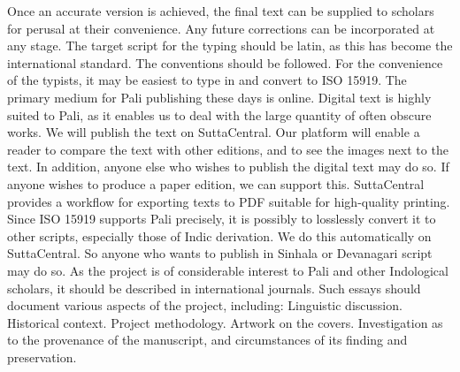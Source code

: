 {}Once an accurate version is achieved, the final text can be supplied to scholars for perusal at their convenience. Any future corrections can be incorporated at any stage.\markdownRendererInterblockSeparator
{}The target script for the typing should be latin, as this has become the international standard. The  conventions should be followed. For the convenience of the typists, it may be easiest to type in  and convert to ISO 15919.\markdownRendererInterblockSeparator
{}\markdownRendererInterblockSeparator
{}The primary medium for Pali publishing these days is online. Digital text is highly suited to Pali, as it enables us to deal with the large quantity of often obscure works. We will publish the text on SuttaCentral. Our platform will enable a reader to compare the text with other editions, and to see the images next to the text.\markdownRendererInterblockSeparator
{}In addition, anyone else who wishes to publish the digital text may do so.\markdownRendererInterblockSeparator
{}If anyone wishes to produce a paper edition, we can support this. SuttaCentral provides a workflow for exporting texts to PDF suitable for high-quality printing.\markdownRendererInterblockSeparator
{}Since ISO 15919 supports Pali precisely, it is possibly to losslessly convert it to other scripts, especially those of Indic derivation. We do this automatically on SuttaCentral. So anyone who wants to publish in Sinhala or Devanagari script may do so.\markdownRendererInterblockSeparator
{}\markdownRendererInterblockSeparator
{}As the project is of considerable interest to Pali and other Indological scholars, it should be described in international journals. Such essays should document various aspects of the project, including:\markdownRendererInterblockSeparator
{}\markdownRendererOlBeginTight
{}Linguistic discussion.\markdownRendererOlItemEnd 
{}Historical context.\markdownRendererOlItemEnd 
{}Project methodology.\markdownRendererOlItemEnd 
{}Artwork on the covers.\markdownRendererOlItemEnd 
{}Investigation as to the provenance of the manuscript, and circumstances of its finding and preservation.\markdownRendererOlItemEnd 

